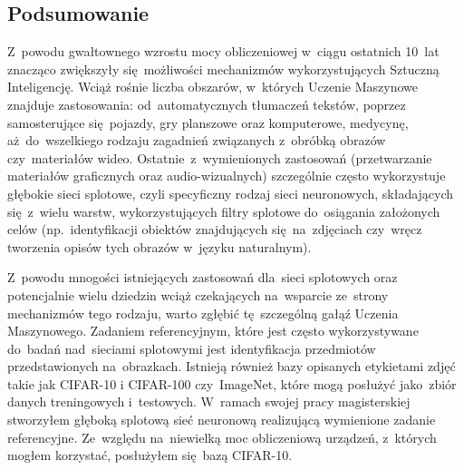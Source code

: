 \documentclass[oneside, 11pt, a4paper]{article}
\begin{document}
\begin{multicols}{2}
\section{Podsumowanie}
Z~powodu gwałtownego wzrostu mocy obliczeniowej w~ciągu ostatnich 10~lat znacząco zwiększyły się~możliwości mechanizmów wykorzystujących Sztuczną Inteligencję. Wciąż rośnie liczba obszarów, w~których Uczenie Maszynowe znajduje zastosowania: od~automatycznych tłumaczeń tekstów, poprzez samosterujące się~pojazdy, gry planszowe oraz komputerowe, medycynę, aż~do~wszelkiego rodzaju zagadnień związanych z~obróbką obrazów czy~materiałów wideo. Ostatnie~z~wymienionych zastosowań (przetwarzanie materiałów graficznych oraz audio-wizualnych) szczególnie często wykorzystuje głębokie sieci splotowe, czyli specyficzny rodzaj sieci neuronowych, składających się~z~wielu warstw, wykorzystujących filtry splotowe do~osiągania założonych celów (np.~identyfikacji obiektów znajdujących się~na~zdjęciach czy~wręcz tworzenia opisów tych obrazów w~języku naturalnym).

Z~powodu mnogości istniejących zastosowań dla~sieci splotowych oraz potencjalnie wielu dziedzin wciąż czekających na~wsparcie ze~strony mechanizmów tego rodzaju, warto zgłębić tę~szczególną gałąź Uczenia Maszynowego. Zadaniem referencyjnym, które jest często wykorzystywane do~badań nad~sieciami splotowymi jest identyfikacja przedmiotów przedstawionych na~obrazkach. Istnieją również bazy opisanych etykietami zdjęć takie jak CIFAR-10 i CIFAR-100\cite{cifar10and100} czy~ImageNet\cite{imagenet}, które mogą posłużyć jako~zbiór danych treningowych i~testowych. W~ramach swojej pracy magisterskiej stworzyłem głęboką splotową sieć neuronową realizującą wymienione zadanie referencyjne. Ze~względu na~niewielką moc obliczeniową urządzeń, z~których mogłem korzystać, posłużyłem się~bazą CIFAR-10.
\vfill

{}




\end{multicols}
\end{document}
